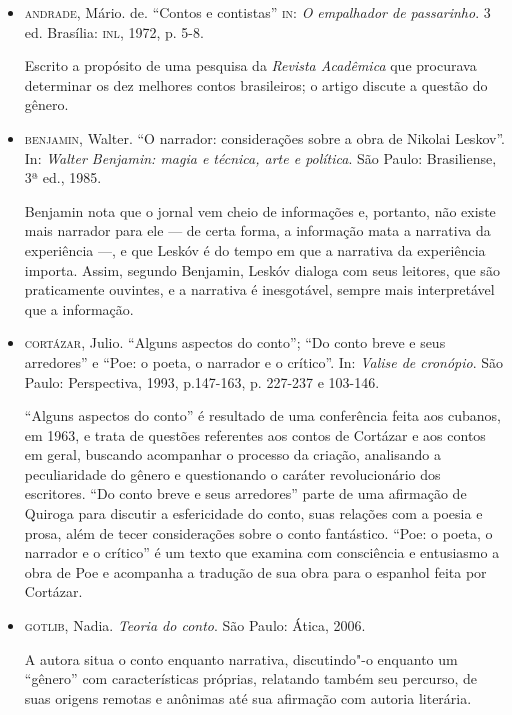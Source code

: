 \documentclass[11pt]{extarticle}
\begin{document}
\begin{itemize}
\item\textsc{andrade}, Mário. de. ``Contos e contistas'' \textsc{in}: \emph{O empalhador de
passarinho}. 3 ed. Brasília: \textsc{inl}, 1972, p. 5-8.

Escrito a propósito
de uma pesquisa da \emph{Revista Acadêmica} que procurava determinar os
dez melhores contos brasileiros; o artigo discute a questão do gênero.

\item\textsc{benjamin}, Walter. ``O narrador: considerações sobre a obra de Nikolai
Leskov''. In: \emph{Walter Benjamin: magia e técnica, arte e política}.
São Paulo: Brasiliense, 3ª ed., 1985.

Benjamin nota que o jornal vem
cheio de informações e, portanto, não existe mais narrador para ele ---
de certa forma, a informação mata a narrativa da experiência ---, e que
Leskóv é do tempo em que a narrativa da experiência importa. Assim,
segundo Benjamin, Leskóv dialoga com seus leitores, que são praticamente
ouvintes, e a narrativa é inesgotável, sempre mais interpretável que a
informação.

\item\textsc{cortázar}, Julio. ``Alguns aspectos do conto''; ``Do conto breve e seus arredores'' e ``Poe: o poeta, o narrador e o crítico''. In: \emph{Valise
de cronópio}. São Paulo: Perspectiva, 1993, p.147-163, p. 227-237 e
103-146. 

``Alguns aspectos do conto'' é resultado de uma conferência
feita aos cubanos, em 1963, e trata de questões referentes aos contos de
Cortázar e aos contos em geral, buscando acompanhar o processo da
criação, analisando a peculiaridade do gênero e questionando o caráter
revolucionário dos escritores. ``Do conto breve e seus arredores'' parte
de uma afirmação de Quiroga para discutir a esfericidade do conto, suas
relações com a poesia e prosa, além de tecer considerações sobre o conto
fantástico. ``Poe: o poeta, o narrador e o crítico'' é um texto que
examina com consciência e entusiasmo a obra de Poe e acompanha a
tradução de sua obra para o espanhol feita por Cortázar.

\item\textsc{gotlib}, Nadia. \emph{Teoria do conto}. São Paulo: Ática, 2006.

A autora situa o conto enquanto narrativa, discutindo"-o enquanto um
``gênero'' com características próprias, relatando também seu percurso, de
suas origens remotas e anônimas até sua afirmação com autoria literária.


\end{itemize}
\end{document}
